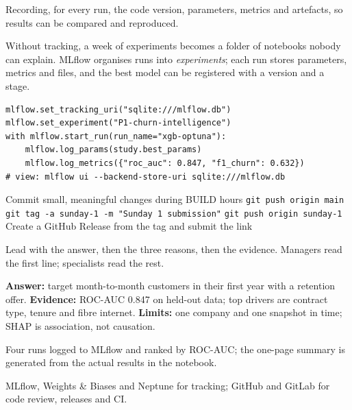 \documentclass[11pt,a4paper]{article}
\begin{document}

\begin{bdef}
Recording, for every run, the code version, parameters, metrics and artefacts, so results can be compared and reproduced.
\end{bdef}
Without tracking, a week of experiments becomes a folder of notebooks nobody can explain. MLflow organises runs into \emph{experiments}; each run stores parameters, metrics and files, and the best model can be registered with a version and a stage.
\begin{bcode}
\begin{lstlisting}
mlflow.set_tracking_uri("sqlite:///mlflow.db")
mlflow.set_experiment("P1-churn-intelligence")
with mlflow.start_run(run_name="xgb-optuna"):
    mlflow.log_params(study.best_params)
    mlflow.log_metrics({"roc_auc": 0.847, "f1_churn": 0.632})
# view: mlflow ui --backend-store-uri sqlite:///mlflow.db
\end{lstlisting}
\end{bcode}

\begin{balgo}
\begin{algorithmic}[1]
\State Commit small, meaningful changes during BUILD hours
\State \texttt{git push origin main}
\State \texttt{git tag -a sunday-1 -m "Sunday 1 submission"}
\State \texttt{git push origin sunday-1}
\State Create a GitHub Release from the tag and submit the link
\end{algorithmic}
\end{balgo}
\begin{bdef}
Lead with the answer, then the three reasons, then the evidence. Managers read the first line; specialists read the rest.
\end{bdef}
\begin{bex}
\textbf{Answer:} target month-to-month customers in their first year with a retention offer.
\textbf{Evidence:} ROC-AUC 0.847 on held-out data; top drivers are contract type, tenure and fibre internet.
\textbf{Limits:} one company and one snapshot in time; SHAP is association, not causation.
\end{bex}
\begin{bres}
Four runs logged to MLflow and ranked by ROC-AUC; the one-page summary is generated from the actual results in the notebook.
\end{bres}
\begin{bapp}
MLflow, Weights \& Biases and Neptune for tracking; GitHub and GitLab for code review, releases and CI.
\end{bapp}
\end{document}
